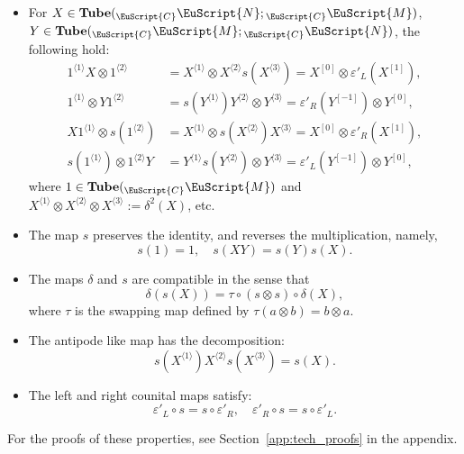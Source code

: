 \documentclass[a4paper,11pt]{article}
\theoremstyle{definition}
\theoremstyle{remark}
\newcommand\eC           {\EuScript{C}}
\newcommand\eM          {\EuScript{M}}
\newcommand\eN         {\EuScript{N}}
\newcommand{\Tube}{\mathbf{Tube}}
\begin{document}
\begin{itemize}
    where $1\in \Tube({}_{\eC}\eM)$.
    \item For $X\in \Tube({}_{\eC}\eN;{}_{\eC}\eM)$, $Y\in \Tube({}_{\eC}\eM;{}_{\eC}\eN)$, the following hold:
    \begin{align}
        1^{\langle 1\rangle} X\otimes 1^{\langle 2\rangle}&= X^{\langle 1\rangle} \otimes X^{\langle 2\rangle} s(X^{\langle 3\rangle})= X^{[0]} \otimes  \varepsilon'_L(X^{[1]}), \label{eq:unit-counit-1} \\  
        1^{\langle 1\rangle} \otimes Y1^{\langle 2\rangle}&= s(Y^{\langle 1\rangle}) Y^{\langle 2\rangle} \otimes Y^{\langle 3\rangle} =\varepsilon'_R(Y^{[-1]}) \otimes  Y^{[0]}, \label{eq:unit-counit-2}\\
        X  1^{\langle 1\rangle} \otimes s(1^{\langle 2\rangle})&= X^{\langle 1\rangle} \otimes s(X^{\langle 2\rangle}) X^{\langle 3\rangle} = X^{[0]} \otimes  \varepsilon'_R(X^{[1]}), \label{eq:unit-counit-3} \\  
        s(1^{\langle 1\rangle}) \otimes 1^{\langle 2\rangle}Y&= Y^{\langle 1\rangle} s(Y^{\langle 2\rangle}) \otimes Y^{\langle 3\rangle} =\varepsilon'_L(Y^{[-1]}) \otimes  Y^{[0]}, \label{eq:unit-counit-4}
    \end{align}
    where $1\in \Tube({}_{\eC}\eM)$ and $X^{\langle 1 \rangle}\otimes X^{\langle 2 \rangle} \otimes X^{\langle 3 \rangle}:= \delta^2(X)$, etc. 
    \item The map $s$ preserves the identity, and reverses the multiplication, namely,  
    \begin{equation}
        s(1)=1,\quad s(XY)=s(Y)s(X). \label{eq:antipode-antimultiplicative}
    \end{equation}
    \item The maps $\delta$ and $s$ are compatible in the sense that 
    \begin{equation}
        \delta(s(X)) = \tau\circ (s\otimes s)\circ\delta(X), \label{eq:delta-antipode-compatibility}
    \end{equation} 
    where $\tau$ is the swapping map defined by $\tau(a\otimes b) = b\otimes a$. 
    \item The antipode like map has the decomposition: 
    \begin{equation} \label{eq:decomp-antipode}
        s(X^{\langle 1\rangle})X^{\langle 2\rangle}s(X^{\langle 3\rangle})=s(X). 
    \end{equation}
    \item The left and right counital maps satisfy:
    \begin{equation} \label{eq:antipode-counital}
        \varepsilon'_L\circ s=s\circ \varepsilon'_R,\quad  \varepsilon'_R\circ s=s\circ \varepsilon'_L.
    \end{equation}
\end{itemize}
For the proofs of these properties, see Section~\ref{app:tech_proofs} in the appendix. 
\end{document}
